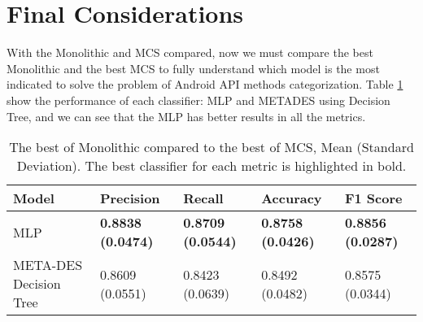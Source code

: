 \section{Final Considerations}\label{result_ending}

With the Monolithic and MCS compared, now we must compare the best Monolithic and the best MCS to fully understand which model is the most indicated to solve the problem of Android API methods categorization. Table \ref{table:overall_comp} show the performance of each classifier: MLP and METADES using Decision Tree, and we can see that the MLP has better results in all the metrics.

\begin{table}[hb]
    \centering
    \renewcommand{\arraystretch}{1.8}
    \begin{tabular}{ p{3cm}p{2.8cm}p{2.8cm}p{2.8cm}p{2.8cm} }
        \toprule
        Model & Precision & Recall & Accuracy & F1 Score \\
        \midrule
        MLP &       \textbf{0.8838 (0.0474)} & \textbf{0.8709 (0.0544)} & \textbf{0.8758 (0.0426)} & \textbf{0.8856 (0.0287)} \\
        META-DES \newline Decision Tree &  0.8609 (0.0551) & 0.8423 (0.0639) & 0.8492 (0.0482) & 0.8575 (0.0344) \\
        \bottomrule
    \end{tabular}
    \caption{%
        The best of Monolithic compared to the best of MCS, Mean (Standard Deviation). The best classifier for each metric is highlighted in bold.
    }\label{table:overall_comp}
\end{table}

